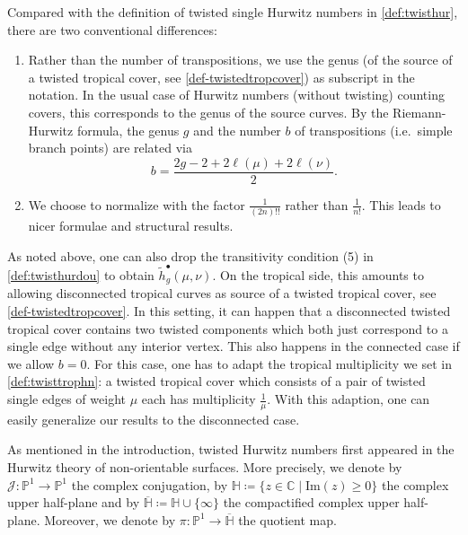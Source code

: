 \begin{rema}
Compared with the definition of twisted single Hurwitz numbers in \cref{def:twisthur}, there are two conventional differences:
\begin{enumerate}
    \item Rather than the number of transpositions, we use the genus (of the source of a twisted tropical cover, see \cref{def-twistedtropcover}) as subscript in the notation. In the usual case of Hurwitz numbers (without twisting) counting covers, this corresponds to the genus of the source curves. By the Riemann-Hurwitz formula, the genus $g$ and the number $b$ of transpositions (i.e.\ simple branch points) are related via
    $$b=\frac{2g-2+2\ell(\mu)+2\ell(\nu)}{2}.$$

    \item We choose to normalize with the factor $\frac{1}{(2n)!!}$ rather than $\frac{1}{n!}$. This leads to nicer formulae and structural results.
\end{enumerate}

\end{rema}
\begin{rema}
    As noted above, one can also drop the transitivity condition (5) in \cref{def:twisthurdou} to obtain $\tilde{h}_g^\bullet(\mu,\nu)$. On the tropical side, this amounts to allowing disconnected tropical curves as source of a twisted tropical cover, see \cref{def-twistedtropcover}. In this setting, it can happen that a disconnected twisted tropical cover contains two twisted components which both just correspond to a single edge without any interior vertex. This also happens in the connected case if we allow $b=0$. For this case, one has to adapt the tropical multiplicity we set in \cref{def:twisttrophn}: a twisted tropical cover which consists of a pair of twisted single edges of weight $\mu$ each has multiplicity $\frac{1}{\mu}$. With this adaption, one can easily generalize our results to the disconnected case.
\end{rema}

As mentioned in the introduction, twisted Hurwitz numbers first appeared in the Hurwitz theory of non-orientable surfaces. More precisely, we denote by $\mathcal{J}\colon\mathbb{P}^1\to\mathbb{P}^1$ the complex conjugation, by $\mathbb{H}\coloneqq\{z\in\mathbb{C}\mid\mathrm{Im}(z)\ge0\}$ the complex upper half-plane and by $\overline{\mathbb{H}}\coloneqq\mathbb{H}\cup\{\infty\}$ the compactified complex upper half-plane. Moreover, we denote by $\pi\colon\mathbb{P}^1\to\overline{\mathbb{H}}$ the quotient map.

